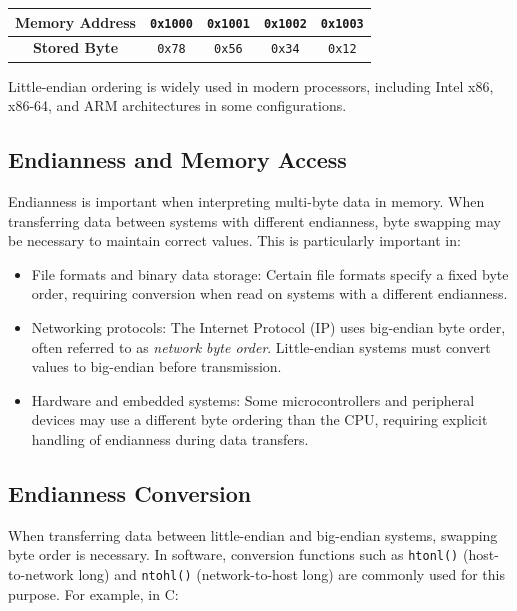 \begin{center}
\begin{tabular}{|c|c|c|c|c|}
\hline
\textbf{Memory Address} & \texttt{0x1000} & \texttt{0x1001} & \texttt{0x1002} & \texttt{0x1003} \\
\hline
\textbf{Stored Byte}    & \texttt{0x78}   & \texttt{0x56}   & \texttt{0x34}   & \texttt{0x12}   \\
\hline
\end{tabular}
\end{center}

Little-endian ordering is widely used in modern processors, including Intel x86, x86-64, and ARM architectures in some configurations.

\subsection{Endianness and Memory Access}
Endianness is important when interpreting multi-byte data in memory. When transferring data between systems with different endianness, byte swapping may be necessary to maintain correct values. This is particularly important in:
\begin{itemize}
    \item File formats and binary data storage: Certain file formats specify a fixed byte order, requiring conversion when read on systems with a different endianness.
    \item Networking protocols: The Internet Protocol (IP) uses big-endian byte order, often referred to as \textit{network byte order}. Little-endian systems must convert values to big-endian before transmission.
    \item Hardware and embedded systems: Some microcontrollers and peripheral devices may use a different byte ordering than the CPU, requiring explicit handling of endianness during data transfers.
\end{itemize}

\subsection{Endianness Conversion}
When transferring data between little-endian and big-endian systems, swapping byte order is necessary. In software, conversion functions such as \texttt{htonl()} (host-to-network long) and \texttt{ntohl()} (network-to-host long) are commonly used for this purpose. For example, in C:

